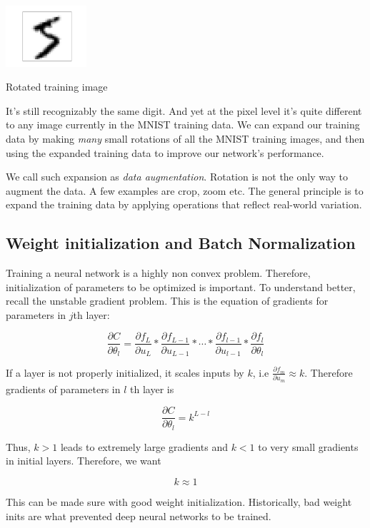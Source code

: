 \documentclass[a4paper]{tufte-handout}
\begin{document}
\begin{marginfigure}
  \includegraphics[width=30mm]{more_data_rotated_5.png}
  \caption{Rotated training image}
  \label{fig:mnist2}
\end{marginfigure}


It's still recognizably the same digit. And yet at the pixel level it's
quite different to any image currently in the MNIST training data. We
can expand our training data by making \emph{many} small rotations of
all the MNIST training images, and then using the expanded training data
to improve our network's performance.

We call such expansion as \emph{data augmentation}. Rotation is not the
only way to augment the data. A few examples are crop, zoom etc. The
general principle is to expand the training data by applying operations
that reflect real-world variation.

\subsection{Weight initialization and Batch
Normalization}\label{weight-initialization-and-batch-normalization}

Training a neural network is a highly non convex problem. Therefore,
initialization of parameters to be optimized is important. To understand
better, recall the unstable gradient problem. This is the equation of
gradients for parameters in \(j\)th layer:

\[\frac{\partial C}{\partial \theta_l} = \frac{\partial f_L}{\partial u_L} * \frac{\partial f_{L-1}}{\partial u_{L-1}} * \cdots * \frac{\partial f_{l-1}}{\partial u_{l-1}} * \frac{\partial f_l}{\partial \theta_l}\]

If a layer is not properly initialized, it scales inputs by \(k\), i.e
\(\frac{\partial f_m}{\partial u_m} \approx k\). Therefore gradients of
parameters in \(l\) th layer is

\[\frac{\partial C}{\partial \theta_l} = k^{L - l}\]

Thus, \(k > 1\) leads to extremely large gradients and \(k<1\) to very
small gradients in initial layers. Therefore, we want

\[k \approx 1\]

This can be made sure with good weight initialization. Historically, bad
weight inits are what prevented deep neural networks to be trained.
\end{document}
